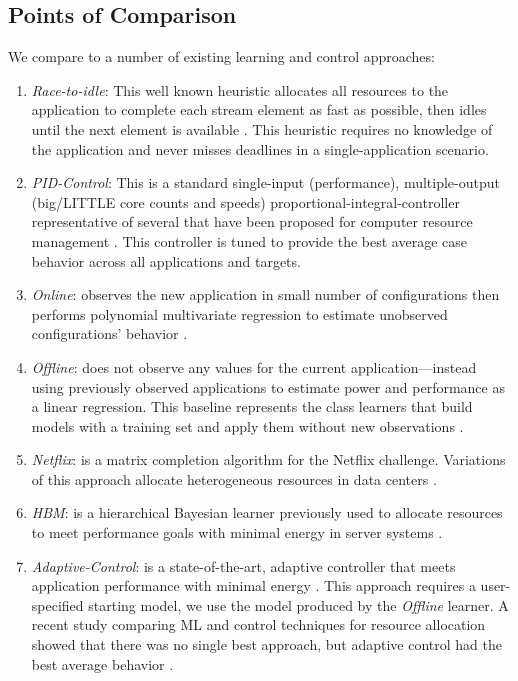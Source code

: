 \subsection{Points of Comparison}
We compare \SYSTEM{} to a number of existing learning and control
approaches:
\begin{enumerate}
\item \textit{Race-to-idle}: This well known heuristic allocates all
  resources to the application to complete each stream element as fast
  as possible, then idles until the next element is available
  \cite{kim-cpsna,powerslope,heisner}.  This heuristic requires no
  knowledge of the application and never misses deadlines in a
  single-application scenario.
\item \textit{PID-Control}: This is a standard single-input
  (performance), multiple-output (big/LITTLE core counts and speeds)
  proportional-integral-controller representative of several that have
  been proposed for computer resource management
  \cite{Hellerstein2004a,METE}.  This controller is tuned to provide
  the best average case behavior across all applications and targets.
\item \textit{Online}: observes the new application in small number of
  configurations then performs polynomial multivariate regression to
  estimate unobserved configurations' behavior
  \cite{LEO,Li2006,Ponamarev}.
\item \textit{Offline}: does not observe any values for the current
  application---instead using previously observed applications to
  estimate power and performance as a linear regression.  This
  baseline represents the class learners that build models with a
  training set and apply them without new observations
  \cite{PUPiL,LeeBrooks2006,CPR}.
\item \textit{Netflix}: is a matrix completion algorithm for the
  Netflix challenge. Variations of this approach allocate
  heterogeneous resources in data centers \cite{Paragon,quasar}.
\item \textit{HBM}: is a hierarchical Bayesian learner previously used
  to allocate resources to meet performance goals with minimal energy
  in server systems \cite{LEO}.
\item \textit{Adaptive-Control}: is a state-of-the-art, adaptive
  controller that meets application performance with minimal energy
  \cite{POET}.  This approach requires a user-specified starting
  model, we use the model produced by the \emph{Offline} learner. A
  recent study comparing ML and control techniques for resource
  allocation showed that there was no single best approach, but
  adaptive control had the best average behavior \cite{TAAS}.
\end{enumerate}


